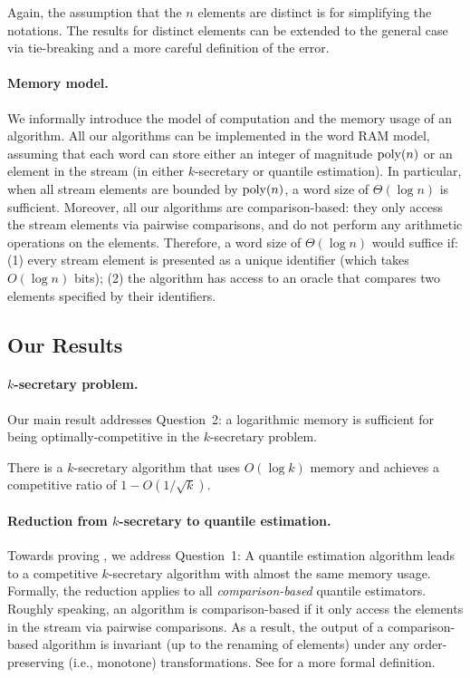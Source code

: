 Again, the assumption that the $n$ elements are distinct is for simplifying the notations. The results for distinct elements can be extended to the general case via tie-breaking and a more careful definition of the error.

\paragraph{Memory model.} We informally introduce the model of computation and the memory usage of an algorithm. All our algorithms can be implemented in the word RAM model, assuming that each word can store either an integer of magnitude $\operatorname*{poly}(n)$ or an element in the stream (in either $k$-secretary or quantile estimation). In particular, when all stream elements are bounded by $\operatorname*{poly}(n)$, a word size of $\Theta(\log n)$ is sufficient. Moreover, all our algorithms are comparison-based: they only access the stream elements via pairwise comparisons, and do not perform any arithmetic operations on the elements. Therefore, a word size of $\Theta(\log n)$ would suffice if: (1) every stream element is presented as a unique identifier (which takes $O(\log n)$ bits); (2) the algorithm has access to an oracle that compares two elements specified by their identifiers.

\subsection{Our Results}
\paragraph{$k$-secretary problem.}
Our main result addresses Question~2: a logarithmic memory is sufficient for being optimally-competitive in the $k$-secretary problem.
\begin{theorem}\label{thm:k-secretary}
    There is a $k$-secretary algorithm that uses $O(\log k)$ memory and achieves a competitive ratio of $1 - O(1/\sqrt{k})$.
\end{theorem}

\paragraph{Reduction from $k$-secretary to quantile estimation.} Towards proving , we address Question~1: A quantile estimation algorithm leads to a competitive $k$-secretary algorithm with almost the same memory usage. Formally, the reduction applies to all \emph{comparison-based} quantile estimators. Roughly speaking, an algorithm is comparison-based if it only access the elements in the stream via pairwise comparisons. As a result, the output of a comparison-based algorithm is invariant (up to the renaming of elements) under any order-preserving (i.e., monotone) transformations. See  for a more formal definition.

